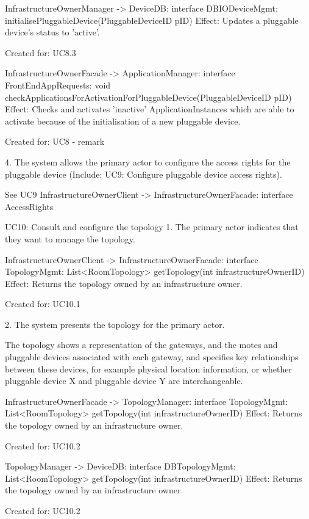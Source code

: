 {{{            InfrastructureOwnerManager -> DeviceDB: interface DBIODeviceMgmt: initialisePluggableDevice(PluggableDeviceID pID)
                Effect: Updates a pluggable device's status to 'active'.
                \item Created for: UC8.3

            InfrastructureOwnerFacade -> ApplicationManager: interface FrontEndAppRequests: void checkApplicationsForActivationForPluggableDevice(PluggableDeviceID pID)
                Effect: Checks and activates 'inactive' ApplicationInstances which are able to activate because of the initialisation of a new pluggable device.
                \item Created for: UC8 - remark

        4. The system allows the primary actor to configure the access rights for the pluggable device (Include: UC9: Configure pluggable device access rights).

            See UC9
            InfrastructureOwnerClient -> InfrastructureOwnerFacade: interface AccessRights

    UC10: Consult and configure the topology
        1. The primary actor indicates that they want to manage the topology.

            InfrastructureOwnerClient -> InfrastructureOwnerFacade: interface TopologyMgmt: List<RoomTopology> getTopology(int infrastructureOwnerID)
                Effect: Returns the topology owned by an infrastructure owner.
                \item Created for: UC10.1

        2. The system presents the topology for the primary actor.
           { The topology shows a representation of the gateways, and the motes and pluggable devices associated with each gateway,
           and specifies key relationships between these devices, for example physical location information,
           or whether pluggable device X and pluggable device Y are interchangeable.

            InfrastructureOwnerFacade -> TopologyManager: interface TopologyMgmt: List<RoomTopology> getTopology(int infrastructureOwnerID)
               Effect: Returns the topology owned by an infrastructure owner.
               \item Created for: UC10.2

            TopologyManager -> DeviceDB: interface DBTopologyMgmt: List<RoomTopology> getTopology(int infrastructureOwnerID)
               Effect: Returns the topology owned by an infrastructure owner.
               \item Created for: UC10.2

}}}}
